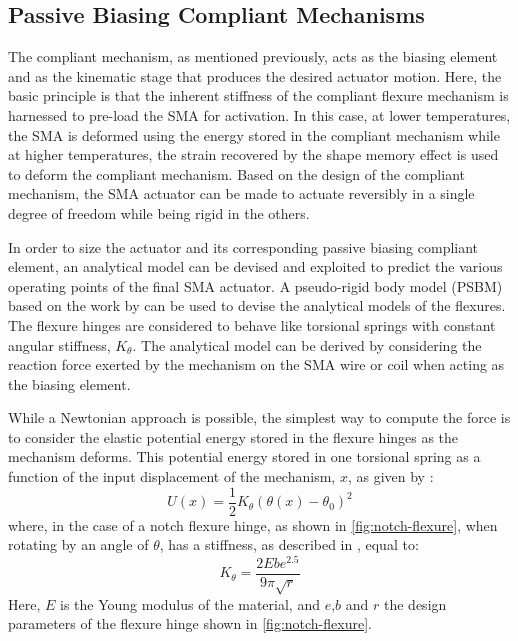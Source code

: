 \subsection{Passive Biasing Compliant Mechanisms}
The compliant mechanism, as mentioned previously, acts as the biasing element and as the kinematic stage that produces the desired actuator motion. Here, the basic principle is that the inherent stiffness of the compliant flexure mechanism is harnessed to pre-load the SMA for activation. In this case, at lower temperatures, the SMA is deformed using the energy stored in the compliant mechanism while at higher temperatures, the strain recovered by the shape memory effect is used to deform the compliant mechanism. Based on the design of the compliant mechanism, the SMA actuator can be made to actuate reversibly in a single degree of freedom while being rigid in the others.

In order to size the actuator and its corresponding passive biasing compliant element, an analytical model can be devised and exploited to predict the various operating points of the final SMA actuator. A pseudo-rigid body model (PSBM) based on the work by \cite{heneinConceptionStructuresArticulees2005} can be used to devise the analytical models of the flexures. The flexure hinges are considered to behave like torsional springs with constant angular stiffness, $K_\theta$. The analytical model can be derived by considering the reaction force exerted by the mechanism on the SMA wire or coil when acting as the biasing element.

While a Newtonian approach is possible, the simplest way to compute the force is to consider the elastic potential energy stored in the flexure hinges as the mechanism deforms. This potential energy stored in one torsional spring as a function of the input displacement of the mechanism, $x$, as given by :
\begin{equation}\label{eq:flexure-pot-energy}
        U(x) = \frac{1}{2}K_{\theta} \left(\theta(x)-\theta_0 \right)^2
\end{equation}
where, in the case of a notch flexure hinge, as shown in \cref{fig:notch-flexure}, when rotating by an angle of $\theta$, has a stiffness, as described in \cite{heneinConceptionStructuresArticulees2005}, equal to:
\begin{equation}\label{eq:flexure-hinge-stiffness}
        K_{\theta} = \frac{2Ebe^{2.5}}{9\pi \sqrt{r}}
\end{equation}
Here, $E$ is the Young modulus of the material, and $e$,$b$ and $r$ the design parameters of the flexure hinge shown in \cref{fig:notch-flexure}.

